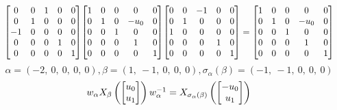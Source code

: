 \documentclass[11pt]{article}
\theoremstyle{definition}
\begin{document}
\[
\scaletoalign{\textwidth}{{\left[\begin{matrix}0 & 0 & 1 & 0 & 0\\0 & 1 & 0 & 0 & 0\\-1 & 0 & 0 & 0 & 0\\0 & 0 & 0 & 1 & 0\\0 & 0 & 0 & 0 & 1\end{matrix}\right]} {\left[\begin{matrix}1 & 0 & 0 & 0 & 0\\0 & 1 & 0 & - u_{0} & 0\\0 & 0 & 1 & 0 & 0\\0 & 0 & 0 & 1 & 0\\0 & 0 & 0 & 0 & 1\end{matrix}\right]} {\left[\begin{matrix}0 & 0 & -1 & 0 & 0\\0 & 1 & 0 & 0 & 0\\1 & 0 & 0 & 0 & 0\\0 & 0 & 0 & 1 & 0\\0 & 0 & 0 & 0 & 1\end{matrix}\right]} = {\left[\begin{matrix}1 & 0 & 0 & 0 & 0\\0 & 1 & 0 & - u_{0} & 0\\0 & 0 & 1 & 0 & 0\\0 & 0 & 0 & 1 & 0\\0 & 0 & 0 & 0 & 1\end{matrix}\right]}}
\]
\[
\alpha = \left( -2, \  0, \  0, \  0, \  0\right), \beta = \left( 1, \  -1, \  0, \  0, \  0\right), \sigma_{\alpha}(\beta) = \left( -1, \  -1, \  0, \  0, \  0\right)
\]
\[
\scaletoalign{\textwidth}{w_{\alpha} X_{\beta}\left(\left[\begin{matrix}u_{0}\\u_{1}\end{matrix}\right]\right) w_{\alpha}^{-1} = X_{\sigma_{\alpha}\left(\beta\right)}\left(\left[\begin{matrix}- u_{0}\\u_{1}\end{matrix}\right]\right)}
\]
\end{document}
